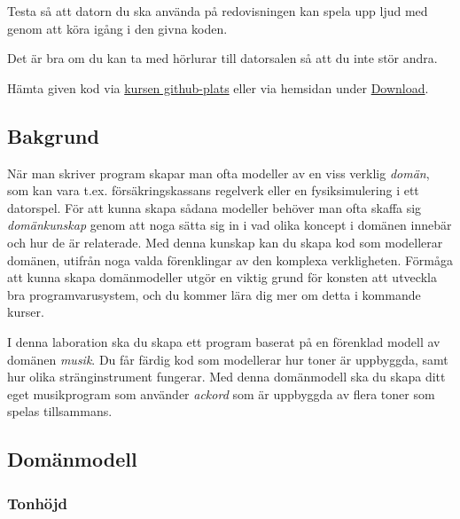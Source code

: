 


\begin{Preparations}
\item Testa så att datorn du ska använda på redovisningen kan spela upp ljud med  genom att köra igång  i den givna koden.
\item Det är bra om du kan ta med hörlurar till datorsalen så att du inte stör andra.
\item Hämta given kod via \href{https://github.com/lunduniversity/introprog/tree/master/workspace/}{kursen github-plats} eller via hemsidan under \href{https://cs.lth.se/pgk/download/}{Download}.
\end{Preparations}

\subsection{Bakgrund}
När man skriver program skapar man ofta modeller av en viss verklig \emph{domän}, som kan vara t.ex. försäkringskassans regelverk eller en fysiksimulering i ett datorspel. För att kunna skapa sådana modeller behöver man ofta skaffa sig  \emph{domänkunskap} genom att noga sätta sig in i vad olika koncept i domänen innebär och hur de är relaterade. Med denna kunskap kan du skapa kod som modellerar domänen, utifrån noga valda förenklingar av den komplexa verkligheten. Förmåga att kunna skapa domänmodeller utgör en viktig grund för konsten att utveckla bra programvarusystem, och du kommer lära dig mer om detta i kommande kurser.

I denna laboration ska du skapa ett program baserat på en förenklad modell av domänen \emph{musik}. Du får färdig kod som modellerar hur toner är uppbyggda, samt hur olika stränginstrument fungerar.
Med denna domänmodell ska du skapa ditt eget musikprogram som använder \emph{ackord} som är uppbyggda av flera toner som spelas tillsammans.

\subsection{Domänmodell}


\subsubsection{Tonhöjd}

